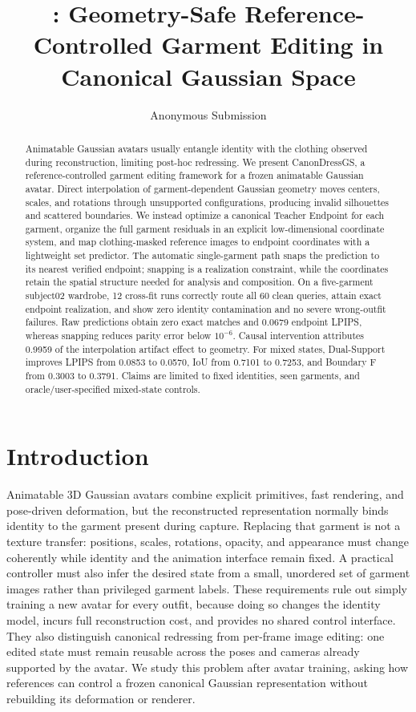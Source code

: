 \documentclass[letterpaper]{article}
\title{\method: Geometry-Safe Reference-Controlled Garment Editing in Canonical Gaussian Space}
\author{Anonymous Submission}
\newcommand{\method}{CanonDressGS}
\newcommand{\dual}{Dual-Support}
\begin{document}
\maketitle

\begin{abstract}
Animatable Gaussian avatars usually entangle identity with the clothing observed during reconstruction, limiting post-hoc redressing. We present \method{}, a reference-controlled garment editing framework for a frozen animatable Gaussian avatar. Direct interpolation of garment-dependent Gaussian geometry moves centers, scales, and rotations through unsupported configurations, producing invalid silhouettes and scattered boundaries. We instead optimize a canonical Teacher Endpoint for each garment, organize the full garment residuals in an explicit low-dimensional coordinate system, and map clothing-masked reference images to endpoint coordinates with a lightweight set predictor. The automatic single-garment path snaps the prediction to its nearest verified endpoint; snapping is a realization constraint, while the coordinates retain the spatial structure needed for analysis and composition. On a five-garment subject02 wardrobe, 12 cross-fit runs correctly route all 60 clean queries, attain exact endpoint realization, and show zero identity contamination and no severe wrong-outfit failures. Raw predictions obtain zero exact matches and 0.0679 endpoint LPIPS, whereas snapping reduces parity error below $10^{-6}$. Causal intervention attributes 0.9959 of the interpolation artifact effect to geometry. For mixed states, \dual{} improves LPIPS from 0.0853 to 0.0570, IoU from 0.7101 to 0.7253, and Boundary F from 0.3003 to 0.3791. Claims are limited to fixed identities, seen garments, and oracle/user-specified mixed-state controls.
\end{abstract}

\section{Introduction}

Animatable 3D Gaussian avatars combine explicit primitives, fast rendering, and pose-driven deformation, but the reconstructed representation normally binds identity to the garment present during capture. Replacing that garment is not a texture transfer: positions, scales, rotations, opacity, and appearance must change coherently while identity and the animation interface remain fixed. A practical controller must also infer the desired state from a small, unordered set of garment images rather than privileged garment labels. These requirements rule out simply training a new avatar for every outfit, because doing so changes the identity model, incurs full reconstruction cost, and provides no shared control interface. They also distinguish canonical redressing from per-frame image editing: one edited state must remain reusable across the poses and cameras already supported by the avatar. We study this problem after avatar training, asking how references can control a frozen canonical Gaussian representation without rebuilding its deformation or renderer.
\end{document}
